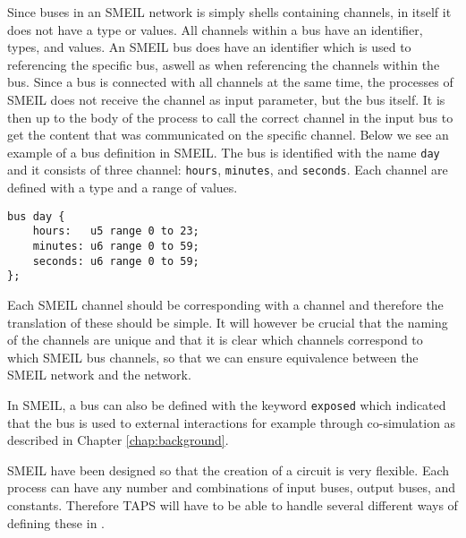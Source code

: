 Since buses in an SMEIL network is simply shells containing channels, in itself it does not have a type or values. All channels within a bus have an identifier, types, and values. An SMEIL bus does have an identifier which is used to referencing the specific bus, aswell as when referencing the channels within the bus. Since a bus is connected with all channels at the same time, the processes of SMEIL does not receive the channel as input parameter, but the bus itself. It is then up to the body of the process to call the correct channel in the input bus to get the content that was communicated on the specific channel.
Below we see an example of a bus definition in SMEIL. The bus is identified with the name \texttt{day} and it consists of three channel: \texttt{hours}, \texttt{minutes}, and \texttt{seconds}. Each channel are defined with a type and a range of values.
\begin{verbatim}
bus day {
    hours:   u5 range 0 to 23;
    minutes: u6 range 0 to 59;
    seconds: u6 range 0 to 59;
};
\end{verbatim}

Each SMEIL channel should be corresponding with a \cspm{} channel and therefore the translation of these should be simple. It will however be crucial that the naming of the \cspm{} channels are unique and that it is clear which \cspm{} channels correspond to which SMEIL bus channels, so that we can ensure equivalence between the SMEIL network and the \cspm{} network.

In SMEIL, a bus can also be defined with the keyword \texttt{exposed} which indicated that the bus is used to external interactions for example through co-simulation as described in Chapter \ref{chap:background}.

SMEIL have been designed so that the creation of a circuit is very flexible. Each process can have any number and combinations of input buses, output buses, and constants. Therefore TAPS will have to be able to handle several different ways of defining these in \cspm{}.


